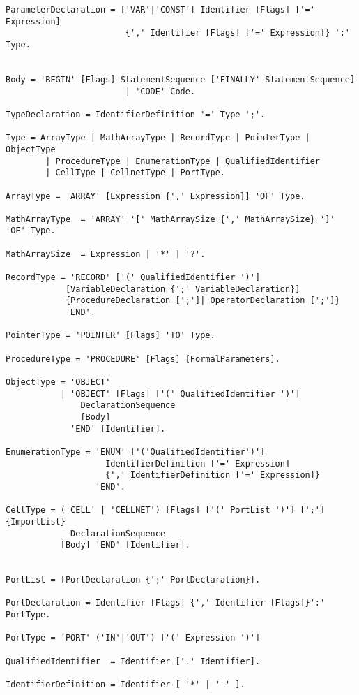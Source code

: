 \documentclass[a4wide,11pt]{article}
\begin{document}
\begin{lstlisting}[style=EBNF]
ParameterDeclaration = ['VAR'|'CONST'] Identifier [Flags] ['=' Expression]
						{',' Identifier [Flags] ['=' Expression]} ':' Type.


Body = 'BEGIN' [Flags] StatementSequence ['FINALLY' StatementSequence]
						| 'CODE' Code.

TypeDeclaration = IdentifierDefinition '=' Type ';'.

Type = ArrayType | MathArrayType | RecordType | PointerType | ObjectType
        | ProcedureType | EnumerationType | QualifiedIdentifier
        | CellType | CellnetType | PortType.

ArrayType = 'ARRAY' [Expression {',' Expression}] 'OF' Type.

MathArrayType  = 'ARRAY' '[' MathArraySize {',' MathArraySize} ']' 'OF' Type.

MathArraySize  = Expression | '*' | '?'.

RecordType = 'RECORD' ['(' QualifiedIdentifier ')']
            [VariableDeclaration {';' VariableDeclaration}]
            {ProcedureDeclaration [';']| OperatorDeclaration [';']}
            'END'.

PointerType = 'POINTER' [Flags] 'TO' Type.

ProcedureType = 'PROCEDURE' [Flags] [FormalParameters].

ObjectType = 'OBJECT'
           | 'OBJECT' [Flags] ['(' QualifiedIdentifier ')']
               DeclarationSequence
               [Body]
             'END' [Identifier].

EnumerationType = 'ENUM' ['('QualifiedIdentifier')']
                    IdentifierDefinition ['=' Expression]
                    {',' IdentifierDefinition ['=' Expression]}
                  'END'.

CellType = ('CELL' | 'CELLNET') [Flags] ['(' PortList ')'] [';'] {ImportList}
             DeclarationSequence
           [Body] 'END' [Identifier].


PortList = [PortDeclaration {';' PortDeclaration}].

PortDeclaration = Identifier [Flags] {',' Identifier [Flags]}':' PortType.

PortType = 'PORT' ('IN'|'OUT') ['(' Expression ')']

QualifiedIdentifier  = Identifier ['.' Identifier].

IdentifierDefinition = Identifier [ '*' | '-' ].


\end{lstlisting}
\end{document}
